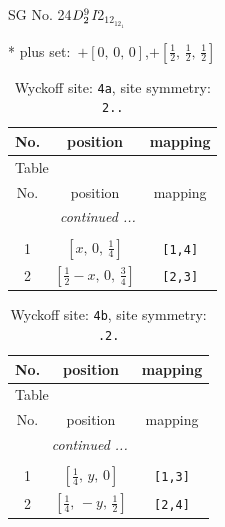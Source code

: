 \documentclass[fleqn,8pt]{jsarticle}
\begin{document}
\setcounter{MaxMatrixCols}{32}

\renewcommand{\tablename}{Table~}
\renewcommand{\figurename}{Figure~}
\begin{center}
\LARGE
SG No. 24\quad$D_{\rm 2}^{9}$\quad$I2_12_12_1$\quad[ orthorhombic ]
\end{center}
* plus set:\,\,\,$+\left[ 0,\, 0,\, 0 \right]$,\quad $+\left[ \frac{1}{2},\, \frac{1}{2},\, \frac{1}{2} \right]$
\renewcommand{\arraystretch}{1.2}
\begin{longtable}{ccc}
\caption{Wyckoff site: {\tt 4a}, site symmetry: {\tt 2..}}
 \\
 \hline \hline
No. & position & mapping \\ \hline \endfirsthead

\multicolumn{2}{l}{\tablename\ \thetable{}} \\
 \hline \hline
No. & position & mapping \\ \hline \endhead

 \hline \hline
\multicolumn{2}{r}{\footnotesize\it continued ...} \\ \endfoot

 \hline \hline
\multicolumn{2}{r}{} \\ \endlastfoot

1 & $\left[ x,\, 0,\, \frac{1}{4} \right]$ & {\tt [1,4]} \\ \hline
2 & $\left[ \frac{1}{2} - x,\, 0,\, \frac{3}{4} \right]$ & {\tt [2,3]} \\
\end{longtable}
\renewcommand{\arraystretch}{1.2}
\begin{longtable}{ccc}
\caption{Wyckoff site: {\tt 4b}, site symmetry: {\tt .2.}}
 \\
 \hline \hline
No. & position & mapping \\ \hline \endfirsthead

\multicolumn{2}{l}{\tablename\ \thetable{}} \\
 \hline \hline
No. & position & mapping \\ \hline \endhead

 \hline \hline
\multicolumn{2}{r}{\footnotesize\it continued ...} \\ \endfoot

 \hline \hline
\multicolumn{2}{r}{} \\ \endlastfoot

1 & $\left[ \frac{1}{4},\, y,\, 0 \right]$ & {\tt [1,3]} \\ \hline
2 & $\left[ \frac{1}{4},\, - y,\, \frac{1}{2} \right]$ & {\tt [2,4]} \\
\end{longtable}
\end{document}
